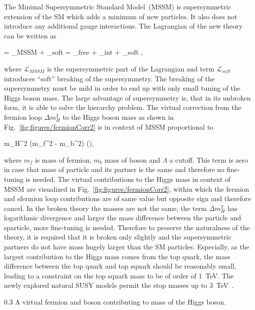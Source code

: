 The Minimal Supersymmetric Standard Model~(MSSM) is supersymmetric extension of the SM which adds a minimum of new particles. It also does not introduce any additional gauge interactions. The Lagrangian of the new theory can be written as

{
     =  _{MSSM} +  _{soft} = _{free} + _{int} + _{soft}    ,
}

where $\mathcal{L}_{MSSM}$ is the supersymmetric part of the Lagrangian and term $\mathcal{L}_{soft}$ introduces ``soft'' breaking of the supersymmetry. The breaking of the supersymmetry must be mild in order to end up with only small tuning of the Higgs boson mass. The large advantage of supersymmetry is, that in its unbroken form, it is able to solve the hierarchy problem. The virtual correction from the fermion loop $\Delta m_{H}^{2}$ to the Higgs boson mass as shown in Fig.~\ref{fig:figures/fermionCorr2} is  in context of MSSM proportional to

{
\Delta m_{H}^{2} \propto (m_{f}^{2} - m_{b}^2)  \left(\right),
}

where $m_{f}$ is mass of fermion, $m_{b}$ mass of boson and $\Lambda$ a cutoff. This term is zero in case that mass of particle and its partner is the same and therefore no fine-tuning is needed. The virtual contributions to the Higgs mass in context of MSSM are visualized in Fig.~\ref{fig:figures/fermionCorr2}, within which the fermion and sfermion loop contributions are of same value but opposite sign and therefore cancel. In the broken theory the masses are not the same, the term $\Delta m_{H}^{2}$ has logarithmic divergence and larger the mass difference between the particle and sparticle, more fine-tuning is needed. Therefore to preserve the naturalness of the theory, it is required that it is broken only slightly and the supersymmetric partners do not have mass hugely larger than the SM particles. Especially, as the largest  contribution to the Higgs mass comes from the top quark, the mass difference between the top quark and top squark should be reasonably small, leading to a constraint on the top squark mass to be of order of 1~TeV. The newly explored natural SUSY models permit the stop masses up to 3~TeV~\cite{Baer:2016bwh}.

                 {0.3}       %
                 { A virtual fermion and boson contributing to mass of the Higgs boson.}

